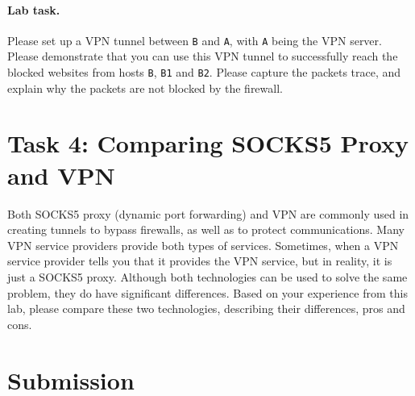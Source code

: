 \paragraph{Lab task.}
Please set up a VPN tunnel between \texttt{B} and \texttt{A}, 
with \texttt{A} being the VPN server. 
Please demonstrate that you can use this VPN tunnel to successfully
reach the blocked websites from hosts
\texttt{B}, \texttt{B1} and \texttt{B2}.    
Please capture the packets trace, and explain why the packets are not blocked
by the firewall.



\section{Task 4: Comparing SOCKS5 Proxy and VPN} 

Both SOCKS5 proxy (dynamic port forwarding) and VPN
are commonly used in creating tunnels to bypass firewalls,
as well as to protect communications.
Many VPN service providers provide both types
of services. Sometimes, when a VPN service provider
tells you that it provides the VPN service, but in reality,
it is just a SOCKS5 proxy. Although both
technologies can be used to solve the same problem, they
do have significant differences. Based on your experience from
this lab, please compare these two technologies,
describing their differences, pros and cons. 




\section{Submission}





